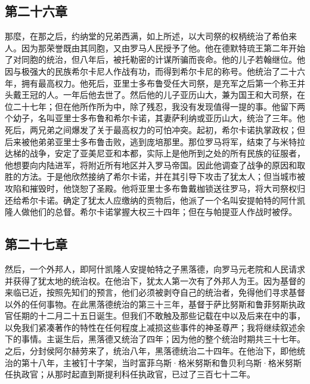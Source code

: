 
\subsection{第二十六章}

那麼，在那之后，约纳堂的兄弟西满，如上所述，以大司祭的权柄统治了希伯来人。因为那荣誉既由其同胞，又由罗马人民授予了他。他在德默特琉王第二年开始了对同胞的统治，但八年后，被托勒密的计谋所骗而丧命。他的儿子若翰继位。他因与极强大的民族希尔卡尼人作战有功，而得到希尔卡尼的称号。他统治了二十六年，拥有最高权力。他死后，亚里士多布鲁受任大司祭，是充军之后第一个称王并头戴王冠的人。一年后他去世了。然后他的儿子亚历山大，兼为国王和大司祭，在位二十七年；但在他所作所为中，除了残忍，我没有发现值得一提的事。他留下两个幼子，名叫亚里士多布鲁和希尔卡诺，其妻萨利纳或亚历山大，统治了三年。他死后，两兄弟之间爆发了关于最高权力的可怕冲突。起初，希尔卡诺执掌政权；但后来被他弟弟亚里士多布鲁击败，逃到庞培那里。那位罗马将军，结束了与米特拉达梯的战争，安定了亚美尼亚和本都，实际上是他所到之处的所有民族的征服者，他想要向内陆进军，将附近所有地区并入罗马帝国。因此他调查了战争的原因和取胜的方法。于是他欣然接纳了希尔卡诺，并在其引导下攻击了犹太人；但当城市被攻陷和摧毁时，他饶恕了圣殿。他将亚里士多布鲁戴枷锁送往罗马，将大司祭权归还给希尔卡诺。确定了犹太人应缴纳的贡物后，他派了一个名叫安提帕特的阿什凯隆人做他们的总督。希尔卡诺掌握大权三十四年；但在与帕提亚人作战时被俘。\par


\subsection{第二十七章}

然后，一个外邦人，即阿什凯隆人安提帕特之子黑落德，向罗马元老院和人民请求并获得了犹太地的统治权。在他治下，犹太人第一次有了外邦人为王。因为基督的来临已近，按照先知们的预言，他们必须被剥夺自己的统治者，免得他们寻求基督以外的任何事物。在此黑落德统治的第三十三年，基督于萨比努斯和鲁菲努斯执政官任期的十二月二十五日诞生。但我们不敢触及那些记载在中以及后来在中的事，以免我们紧凑著作的特性在任何程度上减损这些事件的神圣尊严；我将继续叙述余下的事情。主诞生后，黑落德又统治了四年；因为他的整个统治时期共三十七年。之后，分封侯阿尔赫劳来了，统治八年，黑落德统治二十四年。在他治下，即他统治的第十八年，主被钉十字架，当时富菲乌斯·格米努斯和鲁贝利乌斯·格米努斯任执政官；从那时起直到斯提利科任执政官，已过了三百七十二年。\par

